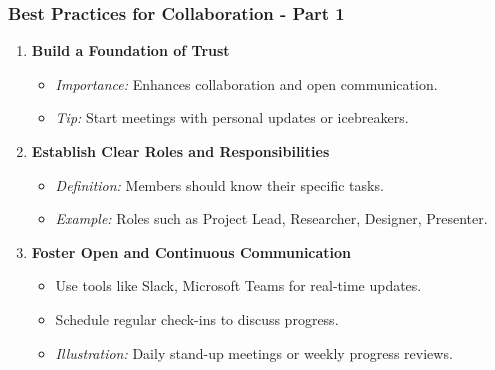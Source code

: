 \documentclass[aspectratio=169]{beamer}
\begin{document}
\begin{frame}[fragile]
    \frametitle{Best Practices for Collaboration - Part 1}
    \begin{enumerate}
        \item \textbf{Build a Foundation of Trust}
            \begin{itemize}
                \item \textit{Importance:} Enhances collaboration and open communication.
                \item \textit{Tip:} Start meetings with personal updates or icebreakers.
            \end{itemize}

        \item \textbf{Establish Clear Roles and Responsibilities}
            \begin{itemize}
                \item \textit{Definition:} Members should know their specific tasks.
                \item \textit{Example:} Roles such as Project Lead, Researcher, Designer, Presenter.
            \end{itemize}

        \item \textbf{Foster Open and Continuous Communication}
            \begin{itemize}
                \item Use tools like Slack, Microsoft Teams for real-time updates. 
                \item Schedule regular check-ins to discuss progress.
                \item \textit{Illustration:} Daily stand-up meetings or weekly progress reviews.
            \end{itemize}
    \end{enumerate}
\end{frame}
\end{document}
